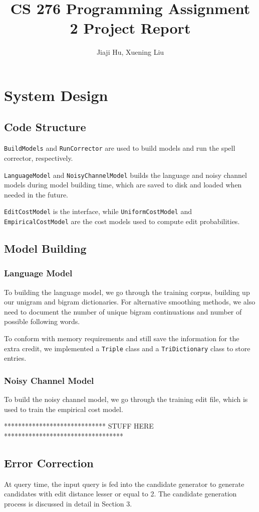 \documentclass[10pt,twocolumn]{article}
\begin{document}
\title{CS 276 Programming Assignment 2 Project Report}
\author{Jiaji Hu, Xuening Liu}
\date{}
\maketitle

\section{System Design}
\subsection{Code Structure}
\texttt{BuildModels} and \texttt{RunCorrector} are used to build models and run the spell corrector, respectively.

\texttt{LanguageModel} and \texttt{NoisyChannelModel} builds the language and noisy channel models during model building time, which are saved to disk and loaded when needed in the future.

\texttt{EditCostModel} is the interface, while \texttt{UniformCostModel} and \texttt{EmpiricalCostModel} are the cost models used to compute edit probabilities.
\subsection{Model Building}
\subsubsection{Language Model}
To building the language model, we go through the training corpus, building up our unigram and bigram dictionaries. For alternative smoothing methods, we also need to document the number of unique bigram continuations and number of possible following words.

To conform with memory requirements and still save the information for the extra credit, we implemented a \texttt{Triple} class and a \texttt{TriDictionary} class to store entries.
\subsubsection{Noisy Channel Model}
To build the noisy channel model, we go through the training edit file, which is used to train the empirical cost model.

***************************** STUFF HERE **********************************
\subsection{Error Correction}
At query time, the input query is fed into the candidate generator to generate candidates with edit distance lesser or equal to 2. The candidate generation process is discussed in detail in Section 3.
\end{document}
